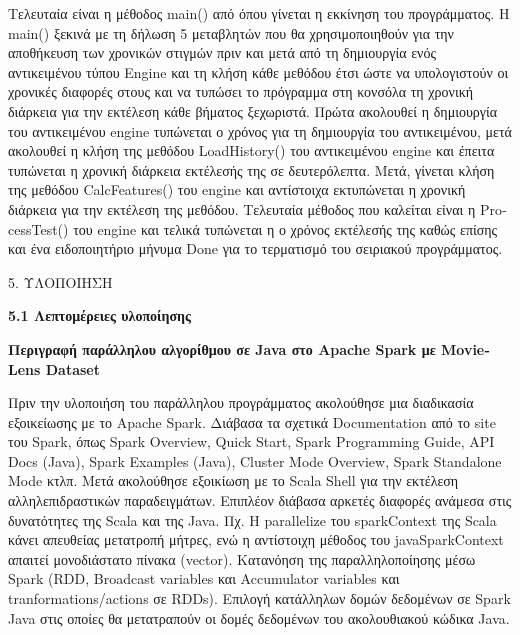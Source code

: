 \documentclass{report}
\begin{document}
Τελευταία είναι η μέθοδος \textlatin{main}() από όπου γίνεται η εκκίνηση του προγράμματος. H \textlatin{main}() ξεκινά με τη δήλωση 5 μεταβλητών που θα χρησιμοποιηθούν για την αποθήκευση των χρονικών στιγμών πριν και μετά από τη δημιουργία ενός αντικειμένου τύπου \textlatin{Engine} και τη κλήση κάθε μεθόδου έτσι ώστε να υπολογιστούν οι χρονικές διαφορές στους  και να τυπώσει το πρόγραμμα στη κονσόλα τη χρονική διάρκεια για την εκτέλεση κάθε βήματος ξεχωριστά. Πρώτα ακολουθεί η δημιουργία του αντικειμένου \textlatin{engine} τυπώνεται ο χρόνος για τη δημιουργία του αντικειμένου, μετά ακολουθεί η κλήση της μεθόδου \textlatin{LoadHistory}() του αντικειμένου \textlatin{engine} και έπειτα τυπώνεται η χρονική διάρκεια εκτέλεσής της  σε δευτερόλεπτα. Μετά, γίνεται κλήση της μεθόδου \textlatin{CalcFeatures}() του \textlatin{engine}  και αντίστοιχα εκτυπώνεται η χρονική διάρκεια για την εκτέλεση της μεθόδου. Τελευταία μέθοδος που καλείται είναι η \textlatin{ProcessTest}() του \textlatin{engine} και τελικά τυπώνεται η ο χρόνος εκτέλεσής της καθώς επίσης και ένα ειδοποιητήριο μήνυμα \textlatin{Done} για το τερματισμό του σειριακού προγράμματος. 






\newpage


\begin{center}
\LARGE{5. ΥΛΟΠΟΙΗΣΗ}
\end{center}

\vspace{5mm}

\textbf{\large{5.1 Λεπτομέρειες υλοποίησης}}

\vspace{5mm}

\textbf{Περιγραφή παράλληλου αλγορίθμου σε \textlatin{Java} στο \textlatin{Apache Spark} με \textlatin{MovieLens Dataset} }

\vspace{2mm}

Πριν την υλοποιήση του παράλληλου προγράμματος ακολούθησε μια διαδικασία εξοικείωσης με το \textlatin{Apache Spark}. Διάβασα τα σχετικά \textlatin{Documentation} από το \textlatin{site} του \textlatin{Spark}, όπως \textlatin{Spark Overview, Quick Start, Spark Programming Guide, API Docs (Java), Spark Examples (Java), Cluster Mode Overview, Spark Standalone Mode} κτλπ. Μετά ακολούθησε εξοικίωση με το \textlatin{Scala Shell} για την εκτέλεση αλληλεπιδραστικών παραδειγμάτων. Επιπλέον διάβασα αρκετές διαφορές ανάμεσα στις δυνατότητες της \textlatin{Scala} και της \textlatin{Java}. Πχ. Η \textlatin{parallelize} του \textlatin{sparkContext} της \textlatin{Scala} κάνει απευθείας μετατροπή μήτρες, ενώ η αντίστοιχη μέθοδος του \textlatin{javaSparkContext} απαιτεί μονοδιάστατο πίνακα \textlatin{(vector)}.
Κατανόηση της παραλληλοποίησης μέσω \textlatin{Spark (RDD, Broadcast variables} και \textlatin{Accumulator variables} και \textlatin{tranformations/actions σε RDDs}). Επιλογή κατάλληλων δομών δεδομένων σε \textlatin{Spark Java} στις οποίες θα μετατραπούν οι δομές δεδομένων του ακολουθιακού κώδικα \textlatin{Java}.
\end{document}
